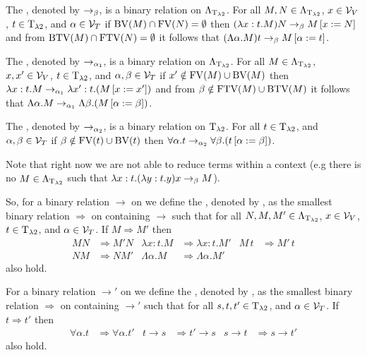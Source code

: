 \begin{definition}\label{def.2.6}
The , denoted by $\rightarrow_\beta$, is a binary relation on $\Lambda_{\text{T}_{\lambda2}}$. For all $M,N\in\Lambda_{\text{T}_{\lambda2}}$, $x\in\mathcal{V}_V$, $t\in\text{T}_{\lambda2}$, and $\alpha\in\mathcal{V}_T$ if $\text{BV}(M)\cap\text{FV}(N)=\emptyset$ then $(\lambda x:t.M)N\rightarrow_\beta M\left[x:=N\right]$ and from $\text{BTV}(M)\cap\text{FTV}(N)=\emptyset$ it follows that $(\Lambda\alpha.M)t\rightarrow_\beta M\left[\alpha:=t\right]$.

The , denoted by $\rightarrow_{\alpha_1}$, is a binary relation on $\Lambda_{\text{T}_{\lambda2}}$. For all $M\in\Lambda_{\text{T}_{\lambda2}}$, $x,x'\in\mathcal{V}_V$, $t\in\text{T}_{\lambda2}$, and $\alpha,\beta\in\mathcal{V}_T$ if $x'\notin\text{FV}(M)\cup\text{BV}(M)$ then $\lambda x:t.M\rightarrow_{\alpha_1}\lambda x':t.(M\left[x:=x'\right])$ and from $\beta\notin\text{FTV}(M)\cup\text{BTV}(M)$ it follows that $\Lambda \alpha.M\rightarrow_{\alpha_1}\Lambda \beta.(M\left[\alpha:=\beta\right])$.

The , denoted by $\rightarrow_{\alpha_2}$, is a binary relation on $\text{T}_{\lambda2}$. For all $t\in\text{T}_{\lambda2}$, and $\alpha,\beta\in\mathcal{V}_T$ if $\beta\notin\text{FV}(t)\cup\text{BV}(t)$ then $\forall\alpha.t\rightarrow_{\alpha_2}\forall\beta.(t\left[\alpha:=\beta\right])$.
\end{definition}

Note that right now we are not able to reduce terms within a context (e.g there is no $M\in\Lambda_{\text{T}_{\lambda2}}$ such that $\lambda x:t.(\lambda y:t.y)x\rightarrow_\beta M$).

\begin{definition}\label{def.2.7}
So, for a binary relation $\rightarrow$ on \lambdaTerms{} we define the , denoted by \lambdaTermContext{\rightarrow}, as the smallest binary relation $\Rightarrow$ on \lambdaTerms{} containing $\rightarrow$ such that for all $N,M,M'\in\Lambda_{\text{T}_{\lambda2}}$, $x\in\mathcal{V}_V$, $t\in\text{T}_{\lambda2}$, and $\alpha\in\mathcal{V}_T$. If $M\Rightarrow M'$ then
\begin{align*}
MN&\Rightarrow M'N      & \lambda x:t.M&\Rightarrow\lambda x:t.M' & M\,t&\Rightarrow M'\,t \\
NM&\Rightarrow NM'   & \Lambda\alpha.M&\Rightarrow \Lambda\alpha.M'   
\end{align*}
also hold.

For a binary relation $\rightarrow'$ on \lambdaTypes{} we define the , denoted by , as the smallest binary relation $\Rightarrow$ on \lambdaTypes{} containing $\rightarrow'$ such that for all $s,t,t'\in\text{T}_{\lambda2}$, and $\alpha\in\mathcal{V}_T$. If $t\Rightarrow t'$ then
\begin{align*}
\forall\alpha.t&\Rightarrow\forall\alpha.t'        & t\to s&\Rightarrow t'\to s      & s\to t&\Rightarrow s\to t'
\end{align*}
also hold.
\end{definition}

